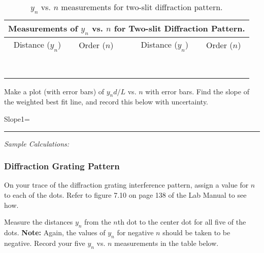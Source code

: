 \begin{table}[htb]
\begin{center}
\begin{tabular}{|c|c|c|c|c|}
\hline
\multicolumn{5}{|c|}{Measurements of $y_n$ vs. $n$ for Two-slit Diffraction Pattern.} \\
\hline
Distance ($y_n$) & Order ($n$) & & Distance ($y_n$) & Order ($n$) \\
\hline
\hspace*{3cm} & \hspace*{3cm} & \hspace*{.3cm} & \hspace*{3cm} & \hspace*{3cm} \\
& & & & \\
\hline
& & & & \\ & & & & \\
\hline
& & & & \\ & & & & \\
\hline
& & & & \\ & & & & \\
\hline
\end{tabular}
\end{center}
\caption{$y_n$ vs. $n$ measurements for two-slit diffraction pattern.}
\label {tab:DI:twoslit}
\end{table}

\noindent
Make a plot (with error bars) of $y_nd/L$ vs. $n$ with error
bars. Find the slope of the weighted best fit line, and record this
below with uncertainty.

\begin{center}
Slope1=~ \rule{3cm}{.1mm}
\end{center}
\vspace*{.5cm}
\noindent
{\it Sample Calculations:}
\newpage

\subsubsection{Diffraction Grating Pattern}

On your trace of the diffraction grating interference pattern, assign
a value for $n$ to each of the dots. Refer to figure 7.10 on page 138
of the Lab Manual to see how.
\vspace*{.5cm}

\noindent
Measure the distances $y_n$ from the $n$th dot to the center dot for
all five of the dots. {\bf Note:} Again, the values of $y_n$ for
negative $n$ should be taken to be negative. Record your five $y_n$
vs. $n$ measurements in the table below.

